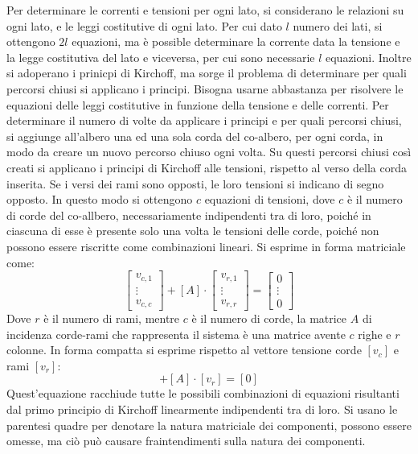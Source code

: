 \documentclass{article}
\numberwithin{equation}{subsection}
\begin{document}
Per determinare le correnti e tensioni per ogni lato, si considerano le relazioni su ogni lato, e le leggi costitutive di ogni lato. Per cui dato $l$ numero dei lati, si 
ottengono $2l$ equazioni, ma è possible determinare la corrente data la tensione e la legge costitutiva del lato e viceversa, per cui sono necessarie $l$ equazioni. 
Inoltre si adoperano i prinicpi di Kirchoff, ma sorge il problema di determinare per quali percorsi chiusi si applicano i principi. Bisogna usarne abbastanza per risolvere le 
equazioni delle leggi costitutive in funzione della tensione e delle correnti. Per determinare il numero di volte da applicare i principi e per quali percorsi chiusi, si 
aggiunge all'albero una ed una sola corda del co-albero, per ogni corda, in modo da creare un nuovo percorso chiuso ogni volta. Su questi percorsi chiusi così creati si 
applicano i principi di Kirchoff alle tensioni, rispetto al verso della corda inserita. Se i versi dei rami sono opposti, le loro tensioni si indicano di segno opposto. 
In questo modo si ottengono $c$ equazioni di tensioni, dove $c$ è il numero di corde del co-allbero, necessariamente indipendenti tra di loro, poiché in ciascuna di esse è 
presente solo una volta le tensioni delle corde, poiché non possono essere riscritte come combinazioni lineari. Si esprime in forma matriciale come:
\begin{equation*}
    \begin{bmatrix}
        v_{c,1}\\
        \vdots\\
        v_{c,c}
    \end{bmatrix}+[A]\cdot\begin{bmatrix}
        v_{r,1}\\
        \vdots\\
        v_{r,r}
    \end{bmatrix}=
    \begin{bmatrix}
        0\\
        \vdots\\
        0
    \end{bmatrix}
\end{equation*}
Dove $r$ è il numero di rami, mentre $c$ è il numero di corde, la matrice $A$ di incidenza corde-rami che rappresenta il sistema è una matrice avente $c$ righe e $r$ colonne. 
In forma compatta si esprime rispetto al vettore tensione corde $[v_c]$ e rami $[v_r]$:
\begin{equation*}
    [v_c]+[A]\cdot[v_r]=[0]
\end{equation*}
Quest'equazione racchiude tutte le possibili combinazioni di equazioni risultanti dal primo principio di Kirchoff linearmente indipendenti tra di loro. 
Si usano le parentesi quadre per denotare la natura matriciale dei componenti, possono essere omesse, ma ciò può causare fraintendimenti sulla natura dei componenti. 
\end{document}
